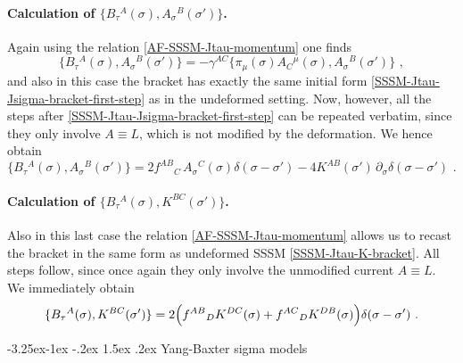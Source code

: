 \documentclass[12pt]{article}
\makeatletter
\renewcommand\subsection{\@startsection{subsection}{2}{\z@}%
                                     {-3.25ex\@plus -1ex \@minus -.2ex}%
                                     {1.5ex \@plus .2ex}%
                                     {\normalfont\bfseries}}
\numberwithin{equation}{section}
\makeatother
\begin{document}
\paragraph{Calculation of $\{ B_{\tau}{}^{A}(\sigma),A_{\sigma}{}^{B}(\sigma') \}$.} Again using the relation \eqref{AF-SSSM-Jtau-momentum} one finds
\begin{equation}
\{ B_{\tau}{}^{A}(\sigma),A_{\sigma}{}^{B}(\sigma') \}=-\gamma^{AC} \{ \pi_{\mu}(\sigma)A_{C}{}^{\mu}(\sigma),A_{\sigma}{}^{B}(\sigma') \} \,\, ,
\end{equation}
and also in this case the bracket has exactly the same initial form \eqref{SSSM-Jtau-Jsigma-bracket-first-step} as in the undeformed setting. Now, however, all the steps after \eqref{SSSM-Jtau-Jsigma-bracket-first-step} can be repeated verbatim, since they only involve $A\equiv L$, which is not modified by the deformation. We hence obtain
\begin{equation}
\{ B_{\tau}{}^{A}(\sigma),A_{\sigma}{}^{B}(\sigma') \}=2f^{AB}{}_{C} \, A_{\sigma}{}^{C}(\sigma)\delta(\sigma-\sigma')-4K^{AB}(\sigma') \, \partial_{\sigma}\delta(\sigma-\sigma') \,\, .
\end{equation}

\paragraph{Calculation of $\{ B_{\tau}{}^{A}(\sigma),K^{BC}(\sigma') \}$.} Also in this last case the relation \eqref{AF-SSSM-Jtau-momentum} allows us to recast the bracket in the same form as undeformed SSSM \eqref{SSSM-Jtau-K-bracket}. All steps follow, since once again they only involve the unmodified current $A\equiv L$. We immediately obtain
\begin{equation}
\{ B_{\tau}{}^{A}(\sigma),K^{BC}(\sigma') \} = 2\Bigl(f^{AB}{}_{D}K^{DC}(\sigma)+f^{AC}{}_{D}K^{DB}(\sigma)\Bigr)\delta(\sigma-\sigma') \,\,  .
\end{equation}




\subsection{Yang-Baxter sigma models}\label{appendix:C-YB}
\end{document}
